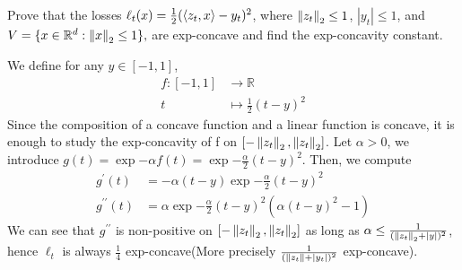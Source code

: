 \begin{exercise}[]{}
	Prove that the losses $ \ell_t(x) = \frac{1}{2}(\langle z_t,x\rangle-y_t)^2 $, where $ \left\|z_t\right\|_2\leq 1 $, $ |y_t|\leq 1 $, and $ V=\{ x\in \mathbb{R}^d : \left\|x\right\|_2 \leq 1 \}, $ are exp-concave and find the exp-concavity constant.
\end{exercise}

\begin{solution}[]
	We define for any $ y \in [-1,1] $,
\begin{align*}
f:[-1,1]& \longrightarrow \mathbb{R} \\
t&\longmapsto \frac{1}{2}(t-y)^2
\end{align*}
Since the composition of a concave function and a linear function is concave, it is enough to study the exp-concavity of f on $ [-\left\|z_t\right\|_2, \left\|z_t\right\|_2] $. Let $ \alpha >0 $, we introduce $ g(t) = \exp{-\alpha f(t)} = \exp{-\frac{\alpha}{2}(t-y)^2} $. Then, we compute 
\begin{align*}
	g^{\prime}(t) &= -\alpha(t-y) \exp{-\frac{\alpha}{2}(t-y)^2} \\
	g^{\prime\prime}(t) &= \alpha\exp{-\frac{\alpha}{2}(t-y)^2}(\alpha(t-y)^2-1)
\end{align*}
We can see that $ g^{\prime\prime} $ is non-positive on $ [-\left\|z_t\right\|_2,\left\|z_t\right\|_2] $ as long as $ \alpha \leq \frac{1}{(\left\|z_t\right\|_2+|y|)^2} $, hence $ \ell_t $ is always $ \frac{1}{4} $ exp-concave(More precisely $ \frac{1}{(\left\|z_t\right\|+|y_t|)^2} $ exp-concave).
\end{solution}
